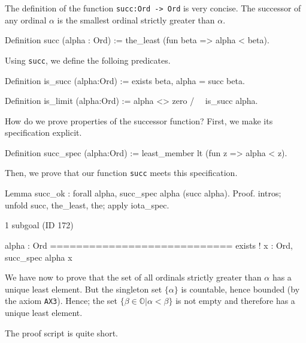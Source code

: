 \documentclass[a4paper]{book}
\begin{document}
{The definition of the function \texttt{succ:Ord -> Ord} is very concise. The successor of any ordinal $\alpha$ is the smallest ordinal strictly greater than $\alpha$.

\label{Functions:succ-sch}

\begin{Coqsrc}
Definition succ (alpha : Ord) := the_least (fun beta => alpha < beta).
\end{Coqsrc}

Using \texttt{succ}, we define the folloing predicates.

\begin{Coqsrc}
Definition is_succ (alpha:Ord) := exists beta, alpha = succ beta.

Definition is_limit (alpha:Ord) := alpha <> zero /\ ~ is_succ alpha.
\end{Coqsrc}




How do we prove properties of the successor function?
First, we make its specification explicit.

\begin{Coqsrc}
Definition succ_spec (alpha:Ord) :=
  least_member   lt (fun z => alpha < z).
\end{Coqsrc}

Then, we prove that our function \texttt{succ} meets this specification. 


\begin{Coqsrc}
Lemma succ_ok : forall alpha,  succ_spec alpha  (succ alpha).
Proof.
  intros; unfold succ, the_least, the;  apply iota_spec.
\end{Coqsrc}

\begin{Coqanswer}
1 subgoal (ID 172)
  
  alpha : Ord
  ============================
  exists ! x : Ord, succ_spec alpha x
\end{Coqanswer}

We have now to prove that the set of all ordinals strictly greater than $\alpha$ has a unique least element. But the singleton set $\{\alpha\}$ is countable, hence  bounded (by the axiom \texttt{AX3}). Hence; the set $\{\beta\in\mathbb{O}|\alpha < \beta\}$ is not empty
and therefore has a unique least element.

The \coq{} proof script is quite short.

}
\end{document}
